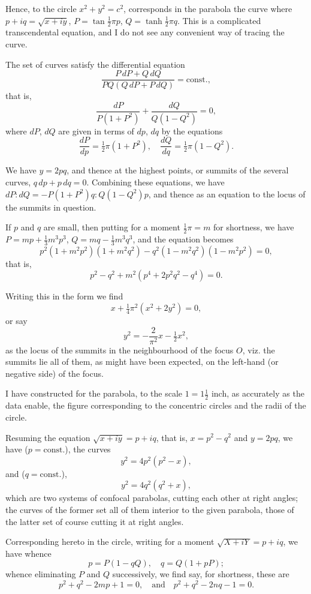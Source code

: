 \documentclass[11pt,a4paper]{book}
\begin{document}
Hence, to the circle $x^2 + y^2 = c^2$, corresponds in the parabola the curve where $p + iq = \sqrt{x+iy}$, $P = \tan \frac{1}{2}\pi p$, $Q = \tanh \frac{1}{2}\pi q$. This is a complicated transcendental equation, and I do not see any convenient way of tracing the curve.

The set of curves satisfy the differential equation
\[
\frac{P\,dP + Q\,dQ}{PQ(Q\,dP + P\,dQ)} = \text{const.},
\]
that is,
\[
\frac{dP}{P(1+P^2)} + \frac{dQ}{Q(1-Q^2)} = 0,
\]
where $dP$, $dQ$ are given in terms of $dp$, $dq$ by the equations
\[
\frac{dP}{dp} = \tfrac{1}{2}\pi(1+P^2), \quad \frac{dQ}{dq} = \tfrac{1}{2}\pi(1-Q^2).
\]

We have $y = 2pq$, and thence at the highest points, or summits of the several curves, $q\,dp + p\,dq = 0$. Combining these equations, we have $dP : dQ = -P(1+P^2)q : Q(1-Q^2)p$, and thence as an equation to the locus of the summits in question.

If $p$ and $q$ are small, then putting for a moment $\frac{1}{2}\pi = m$ for shortness, we have $P = mp + \frac{1}{3}m^3p^3$, $Q = mq - \frac{1}{3}m^3q^3$, and the equation becomes
\[
p^2(1 + m^2p^2)(1 + m^2q^2) - q^2(1 - m^2q^2)(1 - m^2p^2) = 0,
\]
that is,
\[
p^2 - q^2 + m^2(p^4 + 2p^2q^2 - q^4) = 0.
\]

Writing this in the form we find
\[
x + \tfrac{1}{4}\pi^2(x^2 + 2y^2) = 0,
\]
or say
\[
y^2 = -\frac{2}{\pi^2}x - \tfrac{1}{2}x^2,
\]
as the locus of the summits in the neighbourhood of the focus $O$, viz. the summits lie all of them, as might have been expected, on the left-hand (or negative side) of the focus.

I have constructed for the parabola, to the scale $1 = 1\frac{1}{2}$ inch, as accurately as the data enable, the figure corresponding to the concentric circles and the radii of the circle.

Resuming the equation $\sqrt{x+iy} = p + iq$, that is, $x = p^2 - q^2$ and $y = 2pq$, we have ($p = \text{const.}$), the curves
\[
y^2 = 4p^2(p^2 - x),
\]
and ($q = \text{const.}$),
\[
y^2 = 4q^2(q^2 + x),
\]
which are two systems of confocal parabolas, cutting each other at right angles; the curves of the former set all of them interior to the given parabola, those of the latter set of course cutting it at right angles.

Corresponding hereto in the circle, writing for a moment $\sqrt{X+iY} = p + iq$, we have whence
\[
p = P(1 - qQ), \quad q = Q(1 + pP);
\]
whence eliminating $P$ and $Q$ successively, we find say, for shortness, these are
\[
p^2 + q^2 - 2mp + 1 = 0, \quad \text{and} \quad p^2 + q^2 - 2nq - 1 = 0.
\]
\end{document}
